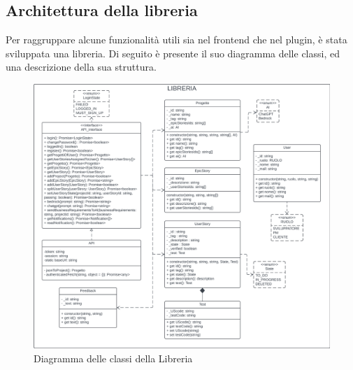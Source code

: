 \documentclass{article}
\begin{document}
\subsection{Architettura della libreria}
Per raggruppare alcune funzionalità utili sia nel frontend che nel plugin, è stata sviluppata una libreria. Di seguito è presente il suo diagramma delle classi, ed una descrizione della sua struttura.
\begin{figure}[H]
    \centering
    \includegraphics[width=\textwidth]{documenti/grafici/libreria_class_diagram.png}
    \caption{Diagramma delle classi della Libreria}
    \label{fig:enter-label}
\end{figure}
\end{document}
